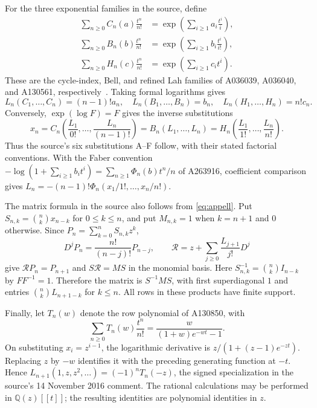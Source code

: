 \documentclass[11pt]{article}
\newcommand{\Q}{\mathbb Q}
\begin{document}
For the three exponential families in the source, define
\[
 \begin{split}
 \sum_{n\geq0}C_n(a)\frac{t^n}{n!}&=\exp\!\left(\sum_{i\geq1}a_i\frac{t^i}{i}\right),\\
 \sum_{n\geq0}B_n(b)\frac{t^n}{n!}&=\exp\!\left(\sum_{i\geq1}b_i\frac{t^i}{i!}\right),\\
 \sum_{n\geq0}H_n(c)\frac{t^n}{n!}&=\exp\!\left(\sum_{i\geq1}c_it^i\right).
 \end{split}
\]
These are the cycle-index, Bell, and refined Lah families of
A036039, A036040, and A130561, respectively~\cite{oeisfamilies}.
Taking formal logarithms gives
\begin{equation}\label{eq:families}
 L_n(C_1,\ldots,C_n)=(n-1)!a_n,\quad
 L_n(B_1,\ldots,B_n)=b_n,\quad
 L_n(H_1,\ldots,H_n)=n!c_n.
\end{equation}
Conversely, $\exp(\log F)=F$ gives the inverse substitutions
\[
 x_n=C_n\left(\frac{L_1}{0!},\ldots,\frac{L_n}{(n-1)!}\right)
 =B_n(L_1,\ldots,L_n)
 =H_n\left(\frac{L_1}{1!},\ldots,\frac{L_n}{n!}\right).
\]
Thus the source's six substitutions A--F follow, with their stated
factorial conventions. With the Faber convention
$-\log(1+\sum_{i\geq1}b_it^i)=\sum_{n\geq1}\Phi_n(b)t^n/n$
of A263916, coefficient comparison gives
$L_n=-(n-1)!\Phi_n(x_1/1!,\ldots,x_n/n!)$.

The matrix formula in the source also follows from \eqref{eq:appell}.
Put $S_{n,k}=\binom nk x_{n-k}$ for $0\leq k\leq n$, and put
$M_{n,k}=1$ when $k=n+1$ and $0$ otherwise. Since
$P_n=\sum_{k=0}^nS_{n,k}z^k$,
\[
 D^jP_n=\frac{n!}{(n-j)!}P_{n-j},\qquad
 \mathcal R=z+\sum_{j\geq0}\frac{L_{j+1}}{j!}D^j
\]
give $\mathcal RP_n=P_{n+1}$ and $S\mathcal R=MS$ in the monomial
basis. Here $S^{-1}_{n,k}=\binom nk I_{n-k}$ by $FF^{-1}=1$.
Therefore the matrix is $S^{-1}MS$, with first superdiagonal $1$
and entries $\binom nk L_{n+1-k}$ for $k\leq n$.
All rows in these products have finite support.

Finally, let $T_n(w)$ denote the row polynomial of A130850, with
\[
 \sum_{n\geq0}T_n(w)\frac{t^n}{n!}
 =\frac{w}{(1+w)e^{-wt}-1}.
\]
On substituting $x_i=z^{i-1}$, the logarithmic derivative is
$z/(1+(z-1)e^{-zt})$. Replacing $z$ by $-w$ identifies it with
the preceding generating function at $-t$. Hence
$L_{n+1}(1,z,z^2,\ldots)=(-1)^nT_n(-z)$, the signed specialization
in the source's 14 November 2016 comment.
The rational calculations may be performed in $\Q(z)[[t]]$;
the resulting identities are polynomial identities in $z$.
\end{document}
